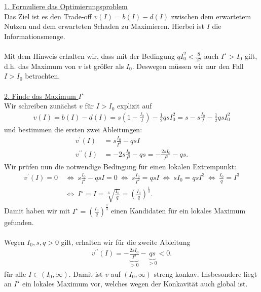 \underline{1. Formuliere das Optimierungsproblem}\\
Das Ziel ist es den Trade-off $v(I) = b(I) - d(I)$ zwischen dem erwartetem Nutzen und dem erwarteten Schaden zu Maximieren. Hierbei ist $I$ die Informationsmenge.\\
\\
Mit dem Hinweis erhalten wir, dass mit der Bedingung $q I_0^2  < \frac{8}{27}$ auch $I^\star > I_0$ gilt, d.h. das Maximum von $v$ ist größer als $I_0$. Deswegen müssen wir nur den Fall $I > I_0$ betrachten.\\
\\
\underline{2. Finde das Maximum $I^\star$}\\
Wir schreiben zunächst $v$ für $I > I_0$ explizit auf
\begin{align*}
	v(I)
	=
	b(I) - d(I) 
	=
	s \left(1 - \frac{I_0}{I}\right)
	- \frac{1}{2} q s I_0^2
	=
	s - s \frac{I_0}{I} - \frac{1}{2} q s I_0^2
\end{align*}
und bestimmen die ersten zwei Ableitungen:
\begin{align*}
	v^\prime(I) &= s \frac{I_0}{I^2} - q s I\\
	v^{\prime \prime}(I) &= -2s \frac{I_0}{I^3} - qs
	= - \frac{2s I_0}{I^3} - qs. 
\end{align*}
Wir prüfen nun die notwendige Bedingung für einen lokalen Extrempunkt:
\begin{align*}
	v^\prime(I) = 0 
	&\ \Leftrightarrow \
	s \frac{I_0}{I^2} - q s I = 0
	\ \Leftrightarrow \
	s \frac{I_0}{I^2} = qs I 
	\ \Leftrightarrow \
	s I_0 = qs I^3
	\ \Leftrightarrow \ 
	 \frac{I_0}{q} =  I^3 \\
	 &\ \Leftrightarrow \
	   I^\star = I  = \sqrt[3]{\frac{I_0}{q}} = \left( \frac{I_0}{q}\right)^{\frac{1}{3}}.
\end{align*}
Damit haben wir mit $I^\star = \left( \frac{I_0}{q}\right)^{\frac{1}{3}}$ einen Kandidaten für ein lokales Maximum gefunden.\\
\\
Wegen  $I_0, s , q > 0$ gilt, erhalten wir für die zweite Ableitung
\begin{align*}
	v^{\prime \prime}(I)
	= -\underbrace{ \frac{2s I_0}{I^3}}_{>0} - \underbrace{qs}_{>0} < 0.
\end{align*}
für alle $I \in (I_0, \infty)$. Damit ist $v$ auf $(I_0, \infty)$ streng konkav.
Insbesondere liegt an $I^\star $ ein lokales Maximum vor, welches wegen der Konkavität auch global ist.\\
\\

